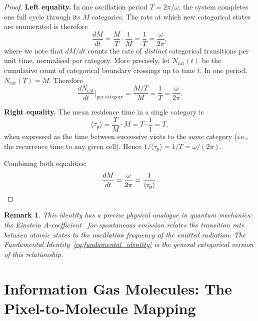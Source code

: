 \documentclass[11pt,twocolumn,a4paper]{article}
\newtheorem{remark}[theorem]{Remark}
\newcommand{\taup}{\tau_{\mathrm{p}}}
\begin{document}
\begin{proof}
\noindent\textbf{Left equality.} In one oscillation period $T = 2\pi/\omega$, the system completes one full cycle through its $M$ categories. The rate at which new categorical states are enumerated is therefore
\begin{equation}
    \frac{dM}{dt} = \frac{M}{T} \cdot \frac{1}{M} = \frac{1}{T} = \frac{\omega}{2\pi},
\end{equation}
where we note that $dM/dt$ counts the rate of \emph{distinct} categorical transitions per unit time, normalised per category. More precisely, let $N_{\text{cat}}(t)$ be the cumulative count of categorical boundary crossings up to time $t$. In one period, $N_{\text{cat}}(T) = M$. Therefore
\begin{equation}
    \frac{dN_{\text{cat}}}{dt}\bigg|_{\text{per category}} = \frac{M/T}{M} = \frac{1}{T} = \frac{\omega}{2\pi}.
\end{equation}

\noindent\textbf{Right equality.} The mean residence time in a single category is
\begin{equation}
    \langle \taup \rangle = \frac{T}{M} \cdot M = T \cdot \frac{1}{1} = T,
\end{equation}
when expressed as the time between successive visits to the \emph{same} category (i.e., the recurrence time to any given cell). Hence $1/\langle \taup \rangle = 1/T = \omega/(2\pi)$.

Combining both equalities:
\begin{equation}
    \frac{dM}{dt} = \frac{\omega}{2\pi} = \frac{1}{\langle \taup \rangle}. \qedhere
\end{equation}
\end{proof}

\begin{remark}
This identity has a precise physical analogue in quantum mechanics: the Einstein $A$-coefficient~\citep{einstein1916, einstein1917} for spontaneous emission relates the transition rate between atomic states to the oscillation frequency of the emitted radiation. The Fundamental Identity~\eqref{eq:fundamental_identity} is the general categorical version of this relationship.
\end{remark}

\section{Information Gas Molecules: The Pixel-to-Molecule Mapping}\label{sec:information_gas}
\end{document}

